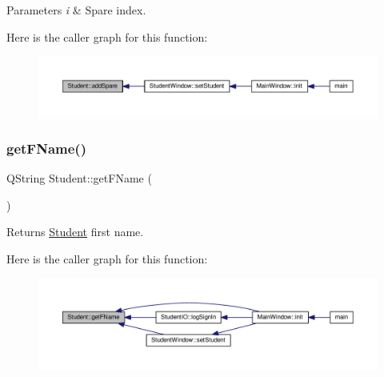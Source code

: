 \begin{DoxyParams}{Parameters}
{\em i} & Spare index. \\
\hline
\end{DoxyParams}
Here is the caller graph for this function\+:
\nopagebreak
\begin{figure}[H]
\begin{center}
\leavevmode
\includegraphics[width=350pt]{class_student_a582d885b873be768e0e95e45d38d8f0e_icgraph}
\end{center}
\end{figure}
\mbox{\label{class_student_a6d4783d4c7ce33aa57e3cd27ac43ab91}} 
\subsubsection{\texorpdfstring{get\+F\+Name()}{getFName()}}
{\footnotesize\ttfamily Q\+String Student\+::get\+F\+Name (\begin{DoxyParamCaption}{ }\end{DoxyParamCaption})}

\begin{DoxyReturn}{Returns}
\hyperlink{class_student}{Student} first name. 
\end{DoxyReturn}
Here is the caller graph for this function\+:
\nopagebreak
\begin{figure}[H]
\begin{center}
\leavevmode
\includegraphics[width=350pt]{class_student_a6d4783d4c7ce33aa57e3cd27ac43ab91_icgraph}
\end{center}
\end{figure}
\mbox{\label{class_student_ac314c299fce856ec970b3a358ca4ea86}} 
